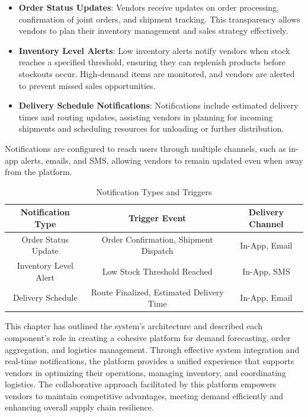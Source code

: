 \begin{itemize}
    \item \textbf{Order Status Updates}: Vendors receive updates on order processing, confirmation of joint orders, and shipment tracking. This transparency allows vendors to plan their inventory management and sales strategy effectively.
    \item \textbf{Inventory Level Alerts}: Low inventory alerts notify vendors when stock reaches a specified threshold, ensuring they can replenish products before stockouts occur. High-demand items are monitored, and vendors are alerted to prevent missed sales opportunities.
    \item \textbf{Delivery Schedule Notifications}: Notifications include estimated delivery times and routing updates, assisting vendors in planning for incoming shipments and scheduling resources for unloading or further distribution.
\end{itemize}

Notifications are configured to reach users through multiple channels, such as in-app alerts, emails, and SMS, allowing vendors to remain updated even when away from the platform.

\begin{table}[H]
    \centering
    \caption{Notification Types and Triggers}
    \begin{tabular}{|c|c|c|}
        \hline
        \textbf{Notification Type} & \textbf{Trigger Event}                   & \textbf{Delivery Channel} \\ \hline
        Order Status Update        & Order Confirmation, Shipment Dispatch    & In-App, Email             \\ \hline
        Inventory Level Alert      & Low Stock Threshold Reached              & In-App, SMS               \\ \hline
        Delivery Schedule          & Route Finalized, Estimated Delivery Time & In-App, Email             \\ \hline
    \end{tabular}
\end{table}


This chapter has outlined the system's architecture and described each component's role in creating a cohesive platform for demand forecasting, order aggregation, and logistics management. Through effective system integration and real-time notifications, the platform provides a unified experience that supports vendors in optimizing their operations, managing inventory, and coordinating logistics. The collaborative approach facilitated by this platform empowers vendors to maintain competitive advantages, meeting demand efficiently and enhancing overall supply chain resilience.
